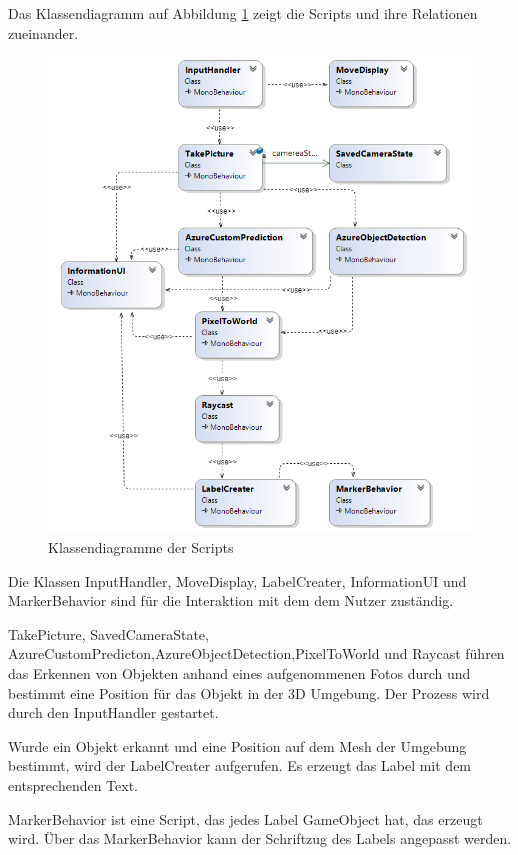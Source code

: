 Das Klassendiagramm auf Abbildung \ref{dia:classdiagramm} zeigt die Scripts und ihre Relationen zueinander.

\begin{figure}[H]
	\centering
	\includegraphics[width=1\textwidth]{images/klassendiagramm.png}
	\caption[Klassendiagramm der Skripts]{Klassendiagramme der Scripts}
	\label{dia:classdiagramm}
\end{figure}
 
Die Klassen InputHandler, MoveDisplay, LabelCreater, InformationUI und MarkerBehavior sind für die Interaktion mit dem dem Nutzer zuständig. 

TakePicture, SavedCameraState, AzureCustomPredicton,AzureObjectDetection,PixelToWorld und Raycast führen das Erkennen von Objekten anhand eines aufgenommenen Fotos durch und bestimmt eine Position für das Objekt in der 3D Umgebung. Der Prozess wird durch den InputHandler gestartet. 

Wurde ein Objekt erkannt und eine Position auf dem Mesh der Umgebung bestimmt, wird der LabelCreater aufgerufen. Es erzeugt das Label mit dem entsprechenden Text.

MarkerBehavior ist eine Script, das jedes Label GameObject hat, das erzeugt wird. Über das MarkerBehavior kann der Schriftzug des Labels angepasst werden.

